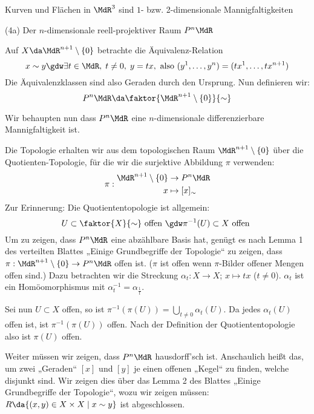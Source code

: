 \documentclass[a4paper,twoside,DIV15,BCOR12mm]{scrbook}
\begin{document}
\begin{beispiele}
\item Kurven und Flächen in $\MdR^3$ sind $1$- bzw. 2-dimensionale Mannigfaltigkeiten

\item[(4a)] Der $n$-dimensionale reell-projektiver Raum $P^n\MdR$
\begin{definition}
Auf $X\da \MdR^{n+1}\setminus\{0\}$ betrachte die Äquivalenz-Relation
\[ x \sim y \gdw \exists t \in \MdR,\; t\ne 0,\; y=tx, \text{ also } (y^1,\ldots,y^n) = (tx^1,\ldots,tx^{n+1})\]
Die Äquivalenzklassen sind also Geraden durch den Ursprung. Nun definieren wir:
\[ P^n\MdR \da \faktor{\MdR^{n+1}\setminus\{0\}}{\sim} \]
\end{definition}

Wir behaupten nun dass $P^n\MdR$ eine $n$-dimensionale differenzierbare Mannigfaltigkeit ist.

Die Topologie erhalten wir aus dem topologischen Raum $\MdR^{n+1}\setminus\{0\}$ über die Quotienten-Topologie, für die wir die surjektive Abbildung $\pi$ verwenden:
\[ \pi:
\begin{aligned}
\MdR^{n+1}\setminus\{0\} &\to P^n\MdR \\
x &\mapsto [x]_\sim
\end{aligned}
\]
Zur Erinnerung: Die Quotiententopologie ist allgemein: 
\[ U\subset \faktor{X}{\sim}\text{ offen } \gdw \pi^{-1}(U)\subset X \text{ offen } \]
Um zu zeigen, dass $P^n\MdR$ eine abzählbare Basis hat, genügt es nach Lemma 1 des verteilten Blattes „Einige Grundbegriffe der Topologie“ zu zeigen, dass $\pi: \MdR^{n+1}\setminus\{0\} \to P^n\MdR$ offen ist. ($\pi$ ist offen wenn $\pi$-Bilder offener Mengen offen sind.) Dazu betrachten wir die Streckung $\alpha_t: X \to X$; $x\mapsto tx$ ($t\ne 0$). $\alpha_t$ ist ein Homöomorphismus mit $\alpha_t^{-1}=\alpha_{\frac 1 t}$.

Sei nun $U\subset X$ offen, so ist $\pi^{-1}(\pi(U)) = \bigcup_{t\ne 0}\alpha_t(U)$. Da jedes $\alpha_t(U)$ offen ist, ist $\pi^{-1}(\pi(U))$ offen. Nach der Definition der Quotiententopologie also ist $\pi(U)$ offen.

Weiter müssen wir zeigen, dass $P^n\MdR$ hausdorff’sch ist. Anschaulich heißt das, um zwei „Geraden“ $[x]$ und $[y]$ je einen offenen „Kegel“ zu finden, welche disjunkt sind. Wir zeigen dies über das Lemma 2 des Blattes „Einige Grundbegriffe der Topologie“, wozu wir zeigen müssen:
$ R \da \{ (x,y) \in X \times X \mid x \sim y \} $ ist abgeschlossen.


\end{beispiele}
\end{document}
